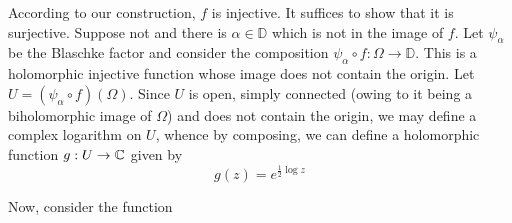 \begin{enumerate}[label=\bfseries Step \Roman*.]
According to our construction, $f$ is injective. It suffices to show that it is surjective. Suppose not and there is $\alpha\in\mathbb D$ which is not in the image of $f$. Let $\psi_\alpha$ be the Blaschke factor and consider the composition $\psi_\alpha\circ f: \Omega\to\mathbb D$. This is a holomorphic injective function whose image does not contain the origin. Let $U = (\psi_\alpha\circ f)(\Omega)$. Since $U$ is open, simply connected (owing to it being a biholomorphic image of $\Omega$) and does not contain the origin, we may define a complex logarithm on $U$, whence by composing, we can define a holomorphic function $g: U\to\mathbb{C}$ given by 
\begin{equation*}
    g(z) = e^{\frac{1}{2}\log z}
\end{equation*}

Now, consider the function 
\end{enumerate}